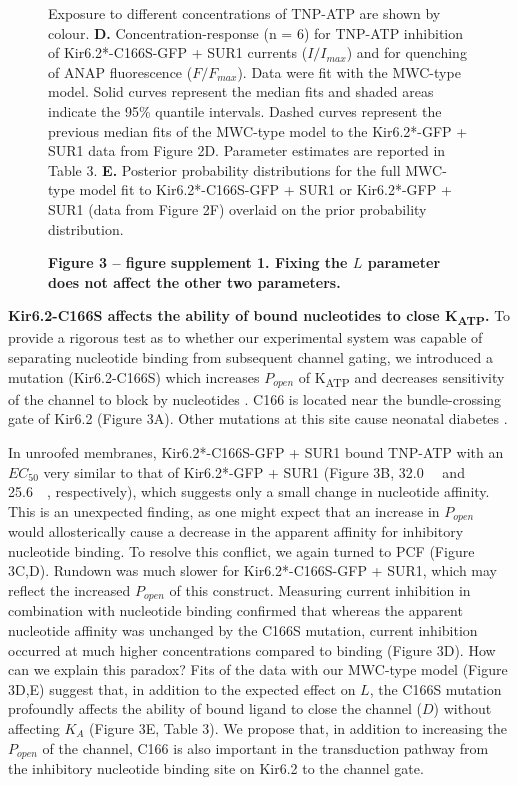 \documentclass[9pt,lineno, onehalfspacing]{elife_modified}
\begin{document}
\begin{figure}
\begin{fullwidth}
{Exposure to different concentrations of TNP-ATP are shown by colour.
\textbf{D.}
Concentration-response (n = 6) for TNP-ATP inhibition of Kir6.2*-C166S-GFP + SUR1 currents ($I/I_{max}$) and for quenching of ANAP fluorescence ($F/F_{max}$).
Data were fit with the MWC-type model.
Solid curves represent the median fits and shaded areas indicate the 95\% quantile intervals.
Dashed curves represent the previous median fits of the MWC-type model to the Kir6.2*-GFP + SUR1 data from Figure 2D.
Parameter estimates are reported in Table 3.
\textbf{E.} Posterior probability distributions for the full MWC-type model fit to Kir6.2*-C166S-GFP + SUR1 or Kir6.2*-GFP + SUR1 (data from Figure 2F) overlaid on the prior probability distribution.
}

\textbf{Figure 3 -- figure supplement 1. Fixing the $L$ parameter does not affect the other two parameters.}
\label{fig:three}
\end{fullwidth}
\end{figure}

\textbf{Kir6.2-C166S affects the ability of bound nucleotides to close K\textsubscript{ATP}.}
To provide a rigorous test as to whether our experimental system was capable of separating nucleotide binding from subsequent channel gating, we introduced a mutation (Kir6.2-C166S) which increases $P_{open}$ of K\textsubscript{ATP} and decreases sensitivity of the channel to block by nucleotides \citep{RN92}.
C166 is located near the bundle-crossing gate of Kir6.2 (Figure 3A).
Other mutations at this site cause neonatal diabetes \citep{RN93, RN94}.

In unroofed membranes, Kir6.2*-C166S-GFP + SUR1 bound TNP-ATP with an $EC_{50}$ very similar to that of Kir6.2*-GFP + SUR1 (Figure 3B, \SI{32.0}{\micro\Molar} and \SI{25.6}{\micro\Molar}, respectively), which suggests only a small change in nucleotide affinity.
This is an unexpected finding, as one might expect that an increase in $P_{open}$ would allosterically cause a decrease in the apparent affinity for inhibitory nucleotide binding.
To resolve this conflict, we again turned to PCF (Figure 3C,D). Rundown was much slower for Kir6.2*-C166S-GFP + SUR1, which may reflect the increased $P_{open}$ of this construct.
Measuring current inhibition in combination with nucleotide binding confirmed that whereas the apparent nucleotide affinity was unchanged by the C166S mutation, current inhibition occurred at much higher concentrations compared to binding (Figure 3D).
How can we explain this paradox?
Fits of the data with our MWC-type model (Figure 3D,E) suggest that, in addition to the expected effect on $L$, the C166S mutation profoundly affects the ability of bound ligand to close the channel ($D$) without affecting $K_A$ (Figure 3E, Table 3).
We propose that, in addition to increasing the $P_{open}$ of the channel, C166 is also important in the transduction pathway from the inhibitory nucleotide binding site on Kir6.2 to the channel gate.
\end{document}
